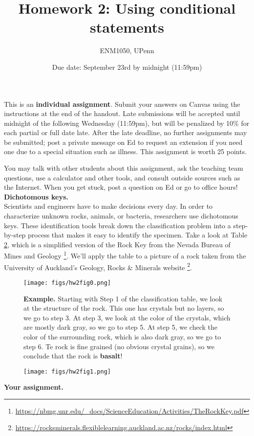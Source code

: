 \documentclass[12pt]{article}
\begin{document}
 
 
\title{Homework 2: Using conditional statements}
\author{ENM1050, UPenn}
\date{Due date: September 23rd by midnight (11:59pm)}
\maketitle

This is an \textbf{individual assignment}. Submit your answers on Canvas using the instructions at the end of the handout. Late submissions will be accepted until midnight of the following Wednesday (11:59pm), but will be penalized by 10\% for each partial or full date late. After the late deadline, no further assignments may be submitted; post a private message on Ed to request an extension if you need one due to a special situation such as illness. This assignment is worth 25 points.

You may talk with other students about this assignment, ask the teaching team questions, use a calculator and other tools, and consult outside sources such as the Internet. When you get stuck, post a question on Ed or go to office hours!\\

\noindent \textbf{Dichotomous keys.}\\

Scientists and engineers have to make decisions every day. In order to characterize unknown rocks, animals, or bacteria, researchers use dichotomous keys. These identification tools break down the classification problem into a step-by-step process that makes it easy to identify the specimen. Take a look at Table \ref{fig:table1}, which is a simplified version of the Rock Key from the Nevada Bureau of Mines and Geology \footnote{\url{https://nbmg.unr.edu/_docs/ScienceEducation/Activities/TheRockKey.pdf}}. We'll apply the table to a picture of a rock taken from the University of Auckland's Geology, Rocks \& Minerals website \footnote{\url{https://rocksminerals.flexiblelearning.auckland.ac.nz/rocks/index.html}}.

\newpage
\begin{figure}[h!]
    \centering
    \texttt{[image: figs/hw2fig0.png]}
    \caption{\textbf{Example.} Starting with Step 1 of the classification table, we look at the structure of the rock. This one has crystals but no layers, so we go to step 3. At step 3, we look at the color of the crystals, which are mostly dark gray, so we go to step 5. At step 5, we check the color of the surrounding rock, which is also dark gray, so we go to step 6. Te rock is fine grained (no obvious crystal grains), so we conclude that the rock is \textbf{basalt}!}
    \label{fig:table1}
\end{figure}
\begin{figure}[h!]
    \centering
    \texttt{[image: figs/hw2fig1.png]}
    \label{fig:table1}
\end{figure}
\newpage
\noindent \textbf{Your assignment.}
\end{document}
